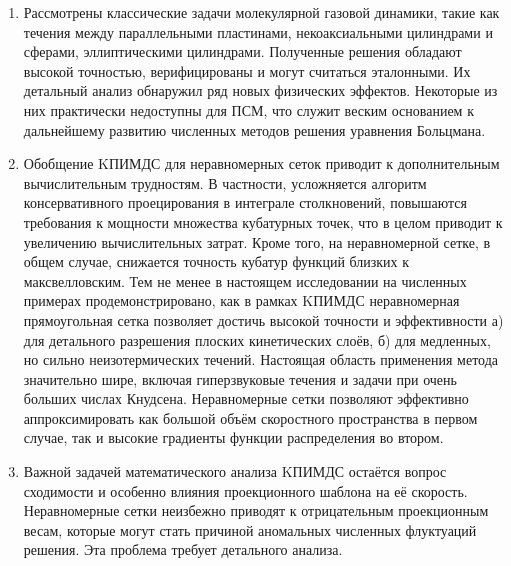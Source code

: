 \begin{enumerate}[wide]

\item Рассмотрены классические задачи молекулярной газовой динамики,
такие как течения между параллельными пластинами, некоаксиальными цилиндрами и сферами, эллиптическими цилиндрами.
Полученные решения обладают высокой точностью, верифицированы и могут считаться эталонными.
Их детальный анализ обнаружил ряд новых физических эффектов.
Некоторые из них практически недоступны для ПСМ,
что служит веским основанием к дальнейшему развитию численных методов решения уравнения Больцмана.

\item Обобщение KПИМДС для неравномерных сеток приводит к дополнительным вычислительным трудностям.
В частности, усложняется алгоритм консервативного проецирования в интеграле столкновений,
повышаются требования к мощности множества кубатурных точек,
что в целом приводит к увеличению вычислительных затрат.
Кроме того, на неравномерной сетке, в общем случае, снижается точность кубатур функций близких к максвелловским.
Тем не менее в настоящем исследовании на численных примерах продемонстрировано,
как в рамках KПИМДС неравномерная прямоугольная сетка позволяет достичь высокой точности и эффективности
а) для детального разрешения плоских кинетических слоёв,
б) для медленных, но сильно неизотермических течений.
Настоящая область применения метода значительно шире, включая
гиперзвуковые течения и задачи при очень больших числах Кнудсена.
Неравномерные сетки позволяют эффективно аппроксимировать
как большой объём скоростного пространства в первом случае,
так и высокие градиенты функции распределения во втором.

\item Важной задачей математического анализа KПИМДС остаётся вопрос сходимости
и особенно влияния проекционного шаблона на её скорость.
Неравномерные сетки неизбежно приводят к отрицательным проекционным весам,
которые могут стать причиной аномальных численных флуктуаций решения.
Эта проблема требует детального анализа.


\end{enumerate}
